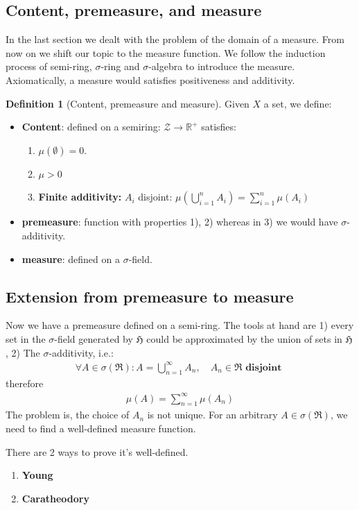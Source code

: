 \documentclass[a4paper,11pt,oneside,fleqn]{book}
\theoremstyle{definition}
\newtheorem{definition}{Definition}[section]
\theoremstyle{remark}
\begin{document}
\subsection{Content, premeasure, and measure}
In the last section we dealt with the problem of the domain of a measure. From now on we shift our topic to the measure function. We follow the induction process of semi-ring, $\sigma$-ring and $\sigma$-algebra to introduce the measure. Axiomatically, a measure would satisfies positiveness and additivity.
\begin{definition}[Content, premeasure and measure]
Given $X$ a set, we define:
	\begin{itemize}
		\item \textbf{Content}: defined on a semiring: $\mathcal{Z} \rightarrow \mathbb{R}^+$ satisfies:
		\begin{enumerate}
			\item $\mu(\emptyset) = 0$. 
			\item $\mu > 0$
			\item \textbf{Finite additivity:} $A_i$ disjoint: $\mu(\bigcup_{i = 1}^n A_i) = \sum_{i = 1}^n \mu(A_i)$
		\end{enumerate}
		\item \textbf{premeasure}: function with properties 1), 2) whereas in 3) we would have $\sigma$-additivity.
		\item \textbf{measure}: defined on a $\sigma$-field.
	\end{itemize}
\end{definition}


\subsection{Extension from premeasure to measure}
Now we have a premeasure defined on a semi-ring. The tools at hand are 1) every set in the $\sigma$-field generated by $\mathfrak{H}$ could be approximated by the union of sets in $\mathfrak{H}$, 2) The $\sigma$-additivity, i.e.:
\begin{align*}
	\forall A \in \sigma(\mathfrak{R}): A = \bigcup_{n =1}^\infty A_n, \quad  A_n \in \mathfrak{R} \textbf{ disjoint }
\end{align*}
therefore
\begin{align*}
	\mu(A) = \sum_{n = 1}^\infty \mu(A_n)
\end{align*}
The problem is, the choice of $A_n$ is not unique. For an arbitrary $A \in \sigma(\mathfrak{R})$, we need to find a well-defined measure function.\par 
There are 2 ways to prove it's well-defined.
\begin{enumerate}
	\item \textbf{Young}
	\item \textbf{Caratheodory}
\end{enumerate} 
\end{document}

